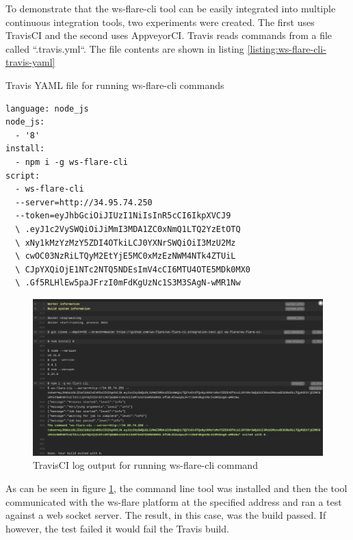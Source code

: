 To demonstrate that the ws-flare-cli tool can be easily integrated into multiple continuous integration tools, two experiments were created. The first uses TravisCI and the second uses AppveyorCI. Travis reads commands from a file called ``.travis.yml``. The file contents are shown in listing \ref{listing:ws-flare-cli-travis-yaml}

\begin{listing}[H]
    \caption{Travis YAML file for running ws-flare-cli commands}
    \label{listing:ws-flare-cli-travis-yaml}
    \begin{verbatim}
language: node_js
node_js:
  - '8'
install:
  - npm i -g ws-flare-cli
script:
  - ws-flare-cli 
  --server=http://34.95.74.250 
  --token=eyJhbGciOiJIUzI1NiIsInR5cCI6IkpXVCJ9
  \ .eyJ1c2VySWQiOiJiMmI3MDA1ZC0xNmQ1LTQ2YzEtOTQ
  \ xNy1kMzYzMzY5ZDI4OTkiLCJ0YXNrSWQiOiI3MzU2Mz
  \ cwOC03NzRiLTQyM2EtYjE5MC0xMzEzNWM4NTk4ZTUiL
  \ CJpYXQiOjE1NTc2NTQ5NDEsImV4cCI6MTU4OTE5MDk0MX0
  \ .Gf5RLHlEw5paJFrzI0mFdKgUzNc1S3M3SAgN-wMR1Nw
\end{verbatim}
\end{listing}

\begin{figure}[H]
  \centering
    \includegraphics[width=1\textwidth]{figures/experiments/experiment-3/travis-output.png}
    \caption{TravisCI log output for running ws-flare-cli command}
    \label{fig:experiment-3-travis-log}
\end{figure}

As can be seen in figure \ref{fig:experiment-3-travis-log}, the command line tool was installed and then the tool communicated with the ws-flare platform at the specified address and ran a test against a web socket server. The result, in this case, was the build passed. If however, the test failed it would fail the Travis build. 


